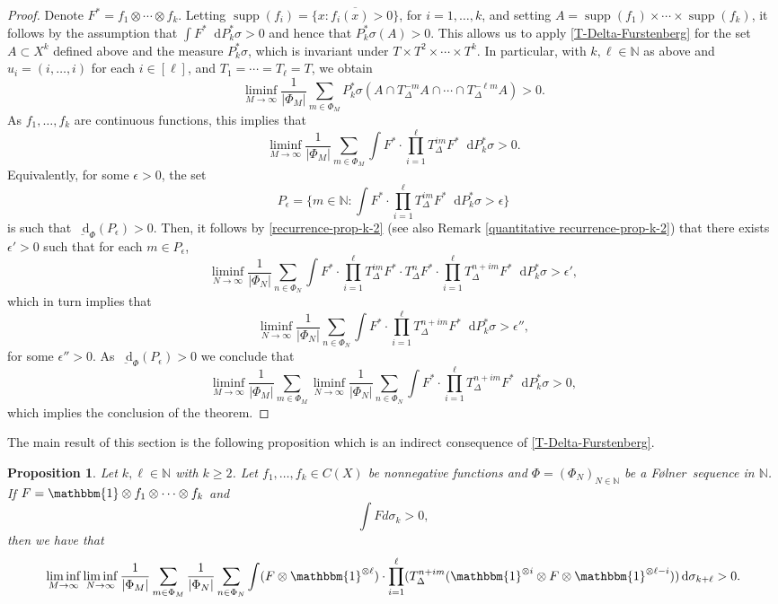 \documentclass[letter, 11pt]{article}
\newcommand{\Folner}{F\o{}lner}
\newtheorem{prop}[theo]{Proposition}
\theoremstyle{definition}
\theoremstyle{plain}
\newcommand{\N}{\mathbb{N}}
\DeclareMathOperator\supp{supp}
\newcommand*\diff{\mathop{}\!\mathrm{d}}
\newcommand{\1}{\mathbbm{1}}
\begin{document}
\begin{proof}
    Denote $F^*=f_1\otimes \cdots \otimes f_k$. Letting $\supp(f_i)=\overline{\{x: f_i(x)>0\}}$, for $i=1,\ldots,k$, and setting $A=\supp(f_1)\times \cdots\times \supp(f_k)$, it follows by the assumption that $\int F^* \diff P_k^*\sigma>0$ and hence that $P_k^*\sigma(A)>0$. This allows us to apply \cref{T-Delta-Furstenberg} for the set $A\subset X^k$ defined above and the measure $P_k^*\sigma$, which is invariant under $T\times T^2 \times \cdots \times T^k$. In particular, with $k,\ell \in \N$ as above and $u_i=(i,\ldots,i)$ for each $i\in [\ell]$, and $T_1=\cdots=T_{\ell}=T$, we obtain 
    $$\liminf_{M\to \infty} \frac{1}{|\Phi_M|}\sum_{m\in \Phi_M} P_k^*\sigma(A \cap T_\Delta^{-m}A \cap \cdots \cap T_\Delta^{-\ell m}A)>0. $$
    As $f_1,\ldots,f_k$ are continuous functions, this implies that
     $$\liminf_{M\to \infty} \frac{1}{|\Phi_M|}\sum_{m\in \Phi_M} \int F^* \cdot \prod_{i=1}^\ell T_\Delta^{im}F^*  \diff P_k^*\sigma>0. $$
 Equivalently, for some $\epsilon>0$, the set 
    $$P_{\epsilon}=\{m\in \N :  \int F^* \cdot \prod_{i=1}^\ell T_\Delta^{im}F^*  \diff P_k^*\sigma>\epsilon\} $$
   is such that $\underline{\diff}_{\Phi}(P_{\epsilon})>0$. Then, it follows by \cref{recurrence-prop-k-2} (see also Remark \ref{quantitative recurrence-prop-k-2}) that there exists $\epsilon'>0$ such that for each $m\in P_{\epsilon}$,
   $$  \liminf_{N\to\infty} \frac{1}{|\Phi_N|} \sum_{n\in \Phi_N} \int F^* \cdot \prod_{i=1}^{\ell}  T_{\Delta}^{im} F^* \cdot T_{\Delta}^n F^* \cdot \prod_{i=1}^{\ell}  T_{\Delta}^{n+im} F^* \diff P_k^*\sigma>\epsilon',$$
   which in turn implies that
    $$  \liminf_{N\to\infty} \frac{1}{|\Phi_N|} \sum_{n\in \Phi_N} \int F^* \cdot \prod_{i=1}^{\ell}  T_{\Delta}^{n+im} F^* \diff P_k^*\sigma>\epsilon'',$$
    for some $\epsilon''>0$. As $\underline{\diff}_{\Phi}(P_\epsilon)>0$ we conclude that
       $$  \liminf_{M\to\infty}\frac{1}{|\Phi_M|} \sum_{m\in \Phi_M} \liminf_{N\to\infty}  \frac{1}{|\Phi_N|} \sum_{n\in \Phi_N} \int F^* \cdot \prod_{i=1}^{\ell}  T_{\Delta}^{n+im} F^* \diff P_k^*\sigma>0,$$
       which implies the conclusion of the theorem.
\end{proof}


The main result of this section is the following proposition which is an 
indirect consequence of \cref{T-Delta-Furstenberg}. 

\begin{prop}\label{multiple-recurrence-T-Delta-uncoupled}
    Let $k,\ell\in \N$ with $k\geq 2$. Let $f_1, \ldots, f_k  \in C(X)$ be nonnegative functions and $\Phi=(\Phi_N)_{N\in \N}$ be a \Folner\ sequence in $\N$. If $F=\1\otimes f_1\otimes\cdots \otimes f_k$ and
    $$\int Fd\sigma_k>0, $$
    then we have that 
    $$  \liminf_{M\to\infty}\liminf_{N\to\infty}\frac{1}{|\Phi_M|} \sum_{m\in \Phi_M}  \frac{1}{|\Phi_N|} \sum_{n\in \Phi_N} \int (F\otimes \1^{\otimes \ell}) \cdot \prod_{i=1}^{\ell}  (T_{\Delta}^{n+im} (\1^{\otimes i} \otimes F\otimes \1^{\otimes \ell -i})) \diff\sigma_{k+\ell}>0.$$ 
\end{prop}
\end{document}

